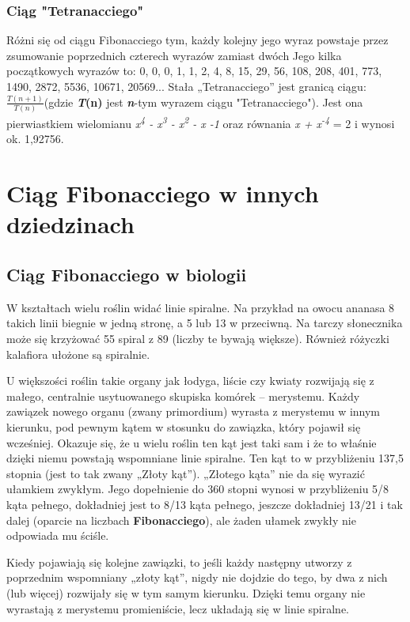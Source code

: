 \documentclass[12pt,a4paper]{article}
\begin{document}
\subsubsection{Ciąg "Tetranacciego"}
Różni się od ciągu Fibonacciego tym, każdy kolejny jego wyraz powstaje przez zsumowanie poprzednich czterech wyrazów zamiast dwóch
Jego kilka początkowych wyrazów to: 0, 0, 0, 1, 1, 2, 4, 8, 15, 29, 56, 108, 208, 401, 773, 1490, 2872, 5536, 10671, 20569...\newline\newline
Stała „Tetranacciego” jest granicą ciągu: $\mathit{\frac{T(n + 1)}{T(n)}}$(gdzie \textbf{\textit{T}(n)} jest \textit{\textbf{n}}-tym wyrazem ciągu "Tetranacciego").
Jest ona pierwiastkiem wielomianu \textit{x\textsuperscript{4} - x\textsuperscript{3} - x\textsuperscript{2} - x -1 } oraz równania \textit{x +  x\textsuperscript{-4}} = 2
i wynosi ok. 1,92756.
\newpage
\section{\Large{Ciąg Fibonacciego w innych dziedzinach}}
\subsection{\large{Ciąg Fibonacciego w biologii}} %
W kształtach wielu roślin widać linie spiralne. Na przykład na owocu ananasa 8 takich linii biegnie w jedną stronę, a 5 lub 13 w przeciwną. Na tarczy słonecznika może się krzyżować 55 spiral z 89 (liczby te bywają większe). Również różyczki kalafiora ułożone są spiralnie.

U większości roślin takie organy jak łodyga, liście czy kwiaty rozwijają się z małego, centralnie usytuowanego skupiska komórek – merystemu. Każdy zawiązek nowego organu (zwany primordium) wyrasta z merystemu w innym kierunku, pod pewnym kątem w stosunku do zawiązka, który pojawił się wcześniej. Okazuje się, że u wielu roślin ten kąt jest taki sam i że to właśnie dzięki niemu powstają wspomniane linie spiralne. Ten kąt to w przybliżeniu 137,5 stopnia (jest to tak zwany „Złoty kąt”). „Złotego kąta” nie da się wyrazić ułamkiem zwykłym. Jego dopełnienie do 360 stopni wynosi w przybliżeniu 5/8 kąta pełnego, dokładniej jest to 8/13 kąta pełnego, jeszcze dokładniej 13/21 i tak dalej (oparcie na liczbach \textbf{Fibonacciego}), ale żaden ułamek zwykły nie odpowiada mu ściśle.

Kiedy pojawiają się kolejne zawiązki, to jeśli każdy następny utworzy z poprzednim wspomniany „złoty kąt”, nigdy nie dojdzie do tego, by dwa z nich (lub więcej) rozwijały się w tym samym kierunku. Dzięki temu organy nie wyrastają z merystemu promieniście, lecz układają się w linie spiralne.
\newpage
\end{document}
